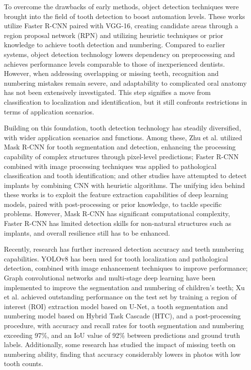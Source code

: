 \documentclass[pdflatex,sn-mathphys-num]{sn-jnl}%
\theoremstyle{thmstyleone}%
\theoremstyle{thmstyletwo}%
\theoremstyle{thmstylethree}%
\begin{document}
 To overcome the drawbacks of early methods, object detection techniques were brought into the field of tooth detection to boost automation levels\cite{r2}\cite{r3}.  These works utilize Faster R-CNN paired with VGG-16, creating candidate areas through a region proposal network (RPN) and utilizing heuristic techniques or prior knowledge to achieve tooth detection and numbering.  Compared to earlier systems, object detection technology lowers dependency on preprocessing and achieves performance levels comparable to those of inexperienced dentists.  However, when addressing overlapping or missing teeth, recognition and numbering mistakes remain severe, and adaptability to complicated oral anatomy has not been extensively investigated.  This step signifies a move from classification to localization and identification, but it still confronts restrictions in terms of application scenarios.

 Building on this foundation, tooth detection technology has steadily diversified, with wider application scenarios and functions.  Among these, Zhu et al.\cite{r4} utilized Mask R-CNN for tooth segmentation and detection, enhancing the processing capability of complex structures through pixel-level predictions; Faster R-CNN combined with image processing techniques was applied to pathological classification and tooth identification\cite{r5,r6,r7}; and other studies have attempted to detect implants by combining CNN with heuristic algorithms\cite{r8}.  The unifying idea behind these works is to exploit the feature extraction capabilities of deep learning models, paired with post-processing or prior knowledge, to tackle specific problems.  However, Mask R-CNN has significant computational complexity, Faster R-CNN has limited detection skills for non-natural structures such as implants, and overall resilience still has to be enhanced.

 Recently, research has further increased detection accuracy and teeth numbering capabilities.  YOLOv8 has been used for tooth localization and pathological detection, combined with image enhancement techniques to improve performance\cite{r12}; Graph convolutional networks and multi-stage deep learning have been implemented to improve the segmentation and numbering of children's teeth\cite{r13,e1}; Xu et al.\cite{r14} achieved outstanding performance on the test set by training a region of interest (ROI) extraction model based on U-Net, a tooth segmentation and numbering model based on Hybrid Task Cascade (HTC), and a post-processing procedure, with accuracy and recall rates for tooth segmentation and numbering exceeding 97\%, and an IoU value of 92\% between predictions and ground truth labels. Additionally, some research has studied the impact of missing teeth on numbering ability, finding that accuracy considerably lowers in photos with low tooth counts\cite{r15}.
\end{document}
